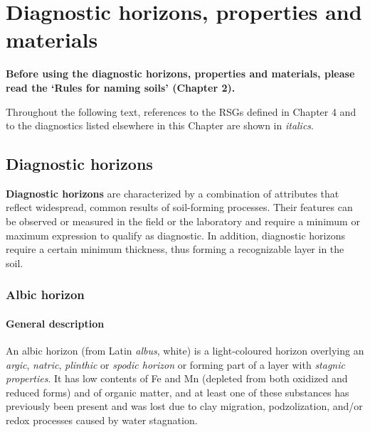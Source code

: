 \documentclass[
  letterpaper,
  DIV=11,
  numbers=noendperiod]{scrreprt}
\begin{document}

\hypertarget{diagnostic-horizons-properties-and-materials}{%
\chapter{Diagnostic horizons, properties and
materials}\label{diagnostic-horizons-properties-and-materials}}

{\textbf{Before using the diagnostic horizons, properties and materials,
please read the `Rules for naming soils' (Chapter 2).}}

Throughout the following text, references to the RSGs defined in Chapter
4 and to the diagnostics listed elsewhere in this Chapter are shown in
\emph{italics}.

\hypertarget{diagnostic-horizons}{%
\section{Diagnostic horizons}\label{diagnostic-horizons}}

\textbf{Diagnostic horizons} are characterized by a combination of
attributes that reflect widespread, common results of soil-forming
processes. Their features can be observed or measured in the field or
the laboratory and require a minimum or maximum expression to qualify as
diagnostic. In addition, diagnostic horizons require a certain minimum
thickness, thus forming a recognizable layer in the soil.

\hypertarget{albic-horizon}{%
\subsection{Albic horizon}\label{albic-horizon}}

\hypertarget{general-description}{%
\subsubsection{General description}\label{general-description}}

An albic horizon (from Latin \emph{albus}, white) is a light-coloured
horizon overlying an \emph{argic}, \emph{natric}, \emph{plinthic} or
\emph{spodic horizon} or forming part of a layer with \emph{stagnic
properties}. It has low contents of Fe and Mn (depleted from both
oxidized and reduced forms) and of organic matter, and at least one of
these substances has previously been present and was lost due to clay
migration, podzolization, and/or redox processes caused by water
stagnation.
\end{document}
